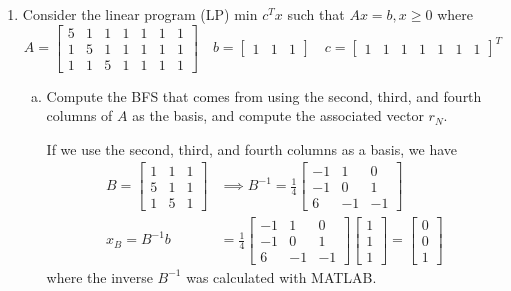 \documentclass{article}
\begin{document}
\begin{enumerate}
	\item Consider the linear program (LP) min $c^T x$ such that $Ax=b, x\ge 0$ where \[A=\begin{bmatrix}
				5 & 1 & 1 & 1 & 1 & 1 & 1 \\
				1 & 5 & 1 & 1 & 1 & 1 & 1 \\
				1 & 1 & 5 & 1 & 1 & 1 & 1
			\end{bmatrix}\quad b=\begin{bmatrix}
				1 & 1 & 1
			\end{bmatrix}\quad c=\begin{bmatrix}
				1 & 1 & 1 & 1 & 1 & 1 & 1
		\end{bmatrix}^T\]

		\begin{enumerate}[a)]
			\item Compute the BFS that comes from using the second, third, and fourth columns of $A$ as the basis, and compute the associated vector $r_N.$
				\begin{soln}
					If we use the second, third, and fourth columns as a basis, we have 
					\begin{align*}
						B=\begin{bmatrix}
							1 & 1 & 1 \\
							5 & 1 & 1 \\
							1 & 5 & 1
						\end{bmatrix}&\implies B^{-1} = \frac{1}{4}\begin{bmatrix}
							-1 & 1 & 0 \\
							-1 & 0 & 1 \\
							6 & -1 & -1
						\end{bmatrix} \\
						x_B = B^{-1}b &= \frac{1}{4}\begin{bmatrix}
							-1 & 1 & 0 \\
							-1 & 0 & 1 \\
							6 & -1 & -1
						\end{bmatrix} \begin{bmatrix}
							1 \\ 1 \\ 1
						\end{bmatrix} = \begin{bmatrix}
							0 \\ 0 \\ 1
						\end{bmatrix}
					\end{align*} where the inverse $B^{-1}$ was calculated with MATLAB. 


\end{soln}
\end{enumerate}
\end{enumerate}
\end{document}
